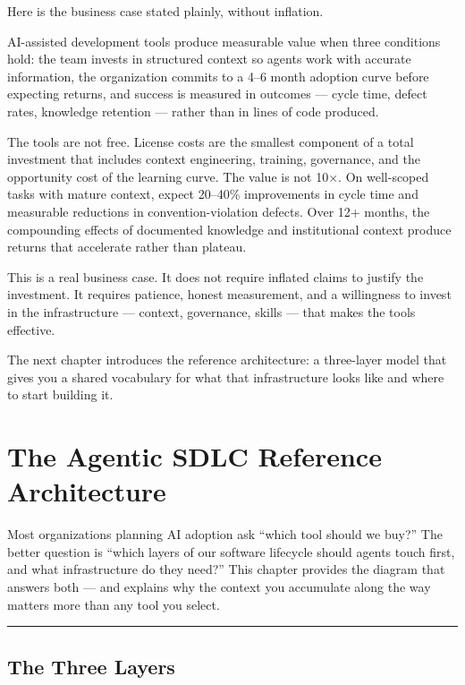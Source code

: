 \documentclass[
  a4paper,
  DIV=11,
  numbers=noendperiod]{scrreprt}
\begin{document}
Here is the business case stated plainly, without inflation.

AI-assisted development tools produce measurable value when three
conditions hold: the team invests in structured context so agents work
with accurate information, the organization commits to a 4--6 month
adoption curve before expecting returns, and success is measured in
outcomes --- cycle time, defect rates, knowledge retention --- rather
than in lines of code produced.

The tools are not free. License costs are the smallest component of a
total investment that includes context engineering, training,
governance, and the opportunity cost of the learning curve. The value is
not 10×. On well-scoped tasks with mature context, expect 20--40\%
improvements in cycle time and measurable reductions in
convention-violation defects. Over 12+ months, the compounding effects
of documented knowledge and institutional context produce returns that
accelerate rather than plateau.

This is a real business case. It does not require inflated claims to
justify the investment. It requires patience, honest measurement, and a
willingness to invest in the infrastructure --- context, governance,
skills --- that makes the tools effective.

The next chapter introduces the reference architecture: a three-layer
model that gives you a shared vocabulary for what that infrastructure
looks like and where to start building it.

\chapter{The Agentic SDLC Reference
Architecture}\label{the-agentic-sdlc-reference-architecture}

Most organizations planning AI adoption ask ``which tool should we
buy?'' The better question is ``which layers of our software lifecycle
should agents touch first, and what infrastructure do they need?'' This
chapter provides the diagram that answers both --- and explains why the
context you accumulate along the way matters more than any tool you
select.

\begin{center}\rule{0.5\linewidth}{0.5pt}\end{center}

\section{The Three Layers}\label{the-three-layers}
\end{document}
